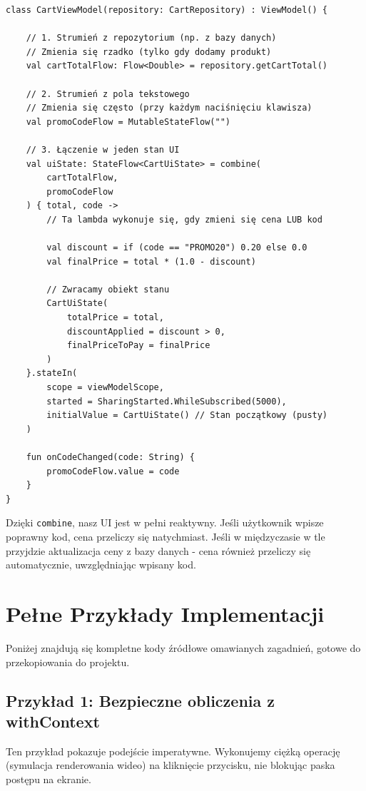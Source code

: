 \begin{verbatim}
class CartViewModel(repository: CartRepository) : ViewModel() {

    // 1. Strumień z repozytorium (np. z bazy danych)
    // Zmienia się rzadko (tylko gdy dodamy produkt)
    val cartTotalFlow: Flow<Double> = repository.getCartTotal()

    // 2. Strumień z pola tekstowego
    // Zmienia się często (przy każdym naciśnięciu klawisza)
    val promoCodeFlow = MutableStateFlow("")

    // 3. Łączenie w jeden stan UI
    val uiState: StateFlow<CartUiState> = combine(
        cartTotalFlow,
        promoCodeFlow
    ) { total, code ->
        // Ta lambda wykonuje się, gdy zmieni się cena LUB kod
        
        val discount = if (code == "PROMO20") 0.20 else 0.0
        val finalPrice = total * (1.0 - discount)

        // Zwracamy obiekt stanu
        CartUiState(
            totalPrice = total,
            discountApplied = discount > 0,
            finalPriceToPay = finalPrice
        )
    }.stateIn(
        scope = viewModelScope,
        started = SharingStarted.WhileSubscribed(5000),
        initialValue = CartUiState() // Stan początkowy (pusty)
    )
    
    fun onCodeChanged(code: String) {
        promoCodeFlow.value = code
    }
}
\end{verbatim}

Dzięki \texttt{combine}, nasz UI jest w pełni reaktywny. Jeśli użytkownik wpisze poprawny kod, cena przeliczy się natychmiast. Jeśli w międzyczasie w tle przyjdzie aktualizacja ceny z bazy danych - cena również przeliczy się automatycznie, uwzględniając wpisany kod.

\section{Pełne Przykłady Implementacji}

Poniżej znajdują się kompletne kody źródłowe omawianych zagadnień, gotowe do przekopiowania do projektu.

\subsection{Przykład 1: Bezpieczne obliczenia z withContext}

Ten przykład pokazuje podejście imperatywne. Wykonujemy ciężką operację (symulacja renderowania wideo) na kliknięcie przycisku, nie blokując paska postępu na ekranie.

